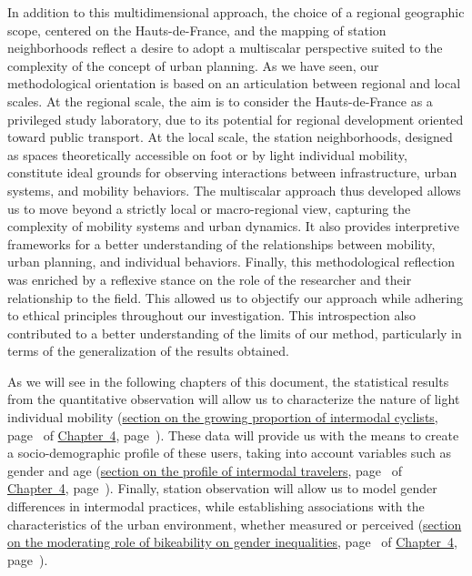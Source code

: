 \begin{refsegment}
In addition to this multidimensional approach, the choice of a regional geographic scope, centered on the Hauts-de-France, and the mapping of station neighborhoods reflect a desire to adopt a multiscalar perspective suited to the complexity of the concept of urban planning. As we have seen, our methodological orientation is based on an articulation between regional and local scales. At the regional scale, the aim is to consider the Hauts-de-France as a privileged study laboratory, due to its potential for regional development oriented toward public transport. At the local scale, the station neighborhoods, designed as spaces theoretically accessible on foot or by light individual mobility, constitute ideal grounds for observing interactions between infrastructure, urban systems, and mobility behaviors. The multiscalar approach thus developed allows us to move beyond a strictly local or macro-regional view, capturing the complexity of mobility systems and urban dynamics. It also provides interpretive frameworks for a better understanding of the relationships between mobility, urban planning, and individual behaviors. Finally, this methodological reflection was enriched by a reflexive stance on the role of the researcher and their relationship to the field. This allowed us to objectify our approach while adhering to ethical principles throughout our investigation. This introspection also contributed to a better understanding of the limits of our method, particularly in terms of the generalization of the results obtained.%

As we will see in the following chapters of this document, the statistical results from the quantitative observation will allow us to characterize the  nature of light individual mobility (\hyperref[chap4:proportion-croissante-voyageurs-intermodaux]{section on the growing proportion of intermodal cyclists}, page~\pageref{chap4:proportion-croissante-voyageurs-intermodaux} of \hyperref[chap4:titre]{Chapter~4}, page~\pageref{chap4:titre}). These data will provide us with the means to create a socio-demographic profile of these users, taking into account variables such as gender and age (\hyperref[chap4:demographie]{section on the profile of intermodal travelers}, page~\pageref{chap4:demographie} of \hyperref[chap4:titre]{Chapter~4}, page~\pageref{chap4:titre}). Finally, station observation will allow us to model gender differences in intermodal practices, while establishing associations with the characteristics of the urban environment, whether measured or perceived (\hyperref[section-chap4:cyclabilite-genre]{section on the moderating role of bikeability on gender inequalities}, page~\pageref{section-chap4:cyclabilite-genre} of \hyperref[chap4:titre]{Chapter~4}, page~\pageref{chap4:titre}).%


\end{refsegment}

